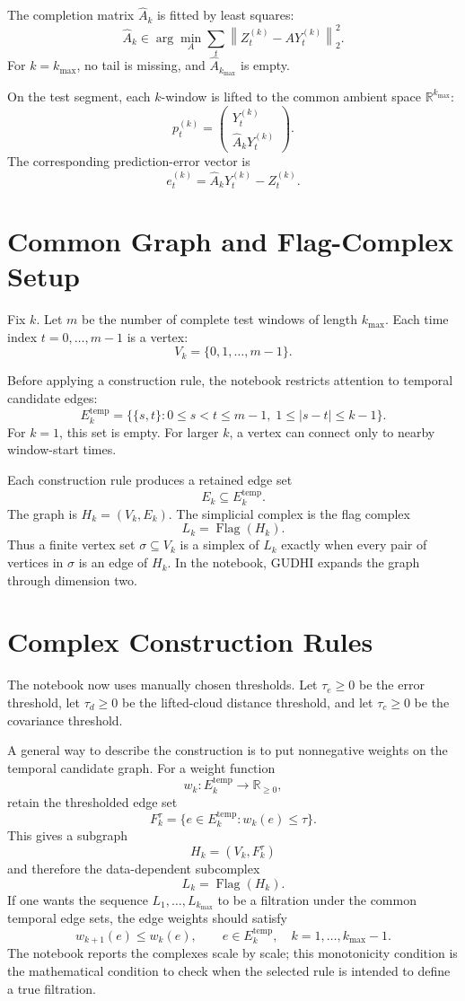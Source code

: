 \documentclass[11pt]{article}
\newcommand{\R}{\mathbb{R}}
\begin{document}
The completion matrix \(\widehat A_k\) is fitted by least squares:
\[
  \widehat A_k
  \in
  \arg\min_A
  \sum_t \left\| Z_t^{(k)} - A Y_t^{(k)} \right\|_2^2.
\]
For \(k=k_{\max}\), no tail is missing, and \(\widehat A_{k_{\max}}\) is empty.

On the test segment, each \(k\)-window is lifted to the common ambient space
\(\R^{k_{\max}}\):
\[
  p_t^{(k)}
  =
  \begin{pmatrix}
    Y_t^{(k)}\\
    \widehat A_k Y_t^{(k)}
  \end{pmatrix}.
\]
The corresponding prediction-error vector is
\[
  e_t^{(k)}
  =
  \widehat A_k Y_t^{(k)} - Z_t^{(k)}.
\]

\section{Common Graph and Flag-Complex Setup}

Fix \(k\). Let \(m\) be the number of complete test windows of length
\(k_{\max}\). Each time index \(t=0,\ldots,m-1\) is a vertex:
\[
  V_k = \{0,1,\ldots,m-1\}.
\]

Before applying a construction rule, the notebook restricts attention to
temporal candidate edges:
\[
  E_k^{\mathrm{temp}}
  =
  \bigl\{\{s,t\}: 0\leq s<t\leq m-1,\; 1\leq |s-t|\leq k-1\bigr\}.
\]
For \(k=1\), this set is empty. For larger \(k\), a vertex can connect only to
nearby window-start times.

Each construction rule produces a retained edge set
\[
  E_k \subseteq E_k^{\mathrm{temp}}.
\]
The graph is \(H_k=(V_k,E_k)\). The simplicial complex is the flag complex
\[
  L_k = \operatorname{Flag}(H_k).
\]
Thus a finite vertex set \(\sigma\subseteq V_k\) is a simplex of \(L_k\) exactly
when every pair of vertices in \(\sigma\) is an edge of \(H_k\). In the notebook,
GUDHI expands the graph through dimension two.


\section{Complex Construction Rules}

The notebook now uses manually chosen thresholds. Let \(\tau_e\geq0\) be the
error threshold, let \(\tau_d\geq0\) be the lifted-cloud distance threshold,
and let \(\tau_c\geq0\) be the covariance threshold.

A general way to describe the construction is to put nonnegative weights on
the temporal candidate graph. For a weight function
\[
  w_k:E_k^{\mathrm{temp}}\to\R_{\geq 0},
\]
retain the thresholded edge set
\[
  F_k^\tau
  =
  \{e\in E_k^{\mathrm{temp}}:w_k(e)\leq \tau\}.
\]
This gives a subgraph
\[
  H_k=(V_k,F_k^\tau)
\]
and therefore the data-dependent subcomplex
\[
  L_k=\operatorname{Flag}(H_k).
\]
If one wants the sequence \(L_1,\ldots,L_{k_{\max}}\) to be a filtration under
the common temporal edge sets, the edge weights should satisfy
\[
  w_{k+1}(e)\leq w_k(e),
  \qquad
  e\in E_k^{\mathrm{temp}},
  \quad
  k=1,\ldots,k_{\max}-1.
\]
The notebook reports the complexes scale by scale; this monotonicity condition
is the mathematical condition to check when the selected rule is intended to
define a true filtration.
\end{document}
